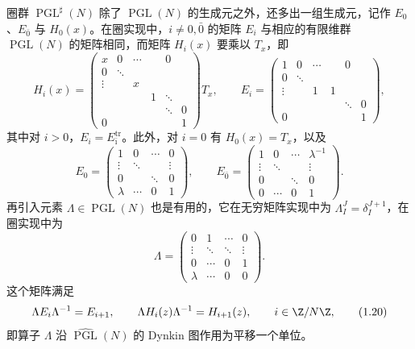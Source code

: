 圈群 $\operatorname{PGL}^{\sharp}(N)$ 除了 $\operatorname{PGL}(N)$ 的生成元之外，还多出一组生成元，记作 $E_0$、$E_{\bar0}$ 与 $H_0(x)$。在圈实现中，$i\neq0,\bar0$ 的矩阵 $E_i$ 与相应的有限维群 $\operatorname{PGL}(N)$ 的矩阵相同，而矩阵 $H_i(x)$ 要乘以 $T_x$，即
\begin{equation}\label{eq:1.17}
H_i(x)=
\begin{pmatrix}
x&0&\cdots&&0\\
0&\ddots&&&&\\
\vdots&&x&&&\\
&&&1&\ddots&\\
&&&&\ddots&0\\
0&&&&&1
\end{pmatrix}T_x,
\qquad
E_i=
\begin{pmatrix}
1&0&\cdots&&0\\
0&\ddots&&&&\\
\vdots&&1&1&&\\
&&&&\ddots&0\\
0&&&&&1
\end{pmatrix},
\tag{1.17}
\end{equation}
其中对 $i>0$，$E_i=E_{\bar\imath}^{\mathrm{tr}}$。此外，对 $i=0$ 有 $H_0(x)=T_x$，以及
\begin{equation}\label{eq:1.18}
E_0=
\begin{pmatrix}
1&0&\cdots&0\\
\vdots&\ddots&&\vdots\\
0&&\ddots&0\\
\lambda&\cdots&0&1
\end{pmatrix},
\qquad
E_{\bar0}=
\begin{pmatrix}
1&0&\cdots&\lambda^{-1}\\
\vdots&\ddots&&\vdots\\
0&&\ddots&0\\
0&\cdots&0&1
\end{pmatrix}.
\tag{1.18}
\end{equation}
再引入元素 $\Lambda\in\widehat{\operatorname{PGL}}(N)$ 也是有用的，它在无穷矩阵实现中为 $\Lambda^J_I=\delta^{J+1}_I$，在圈实现中为
\begin{equation}\label{eq:1.19}
\Lambda=
\begin{pmatrix}
0&1&\cdots&0\\
\vdots&\ddots&\ddots&\vdots\\
0&\cdots&0&1\\
\lambda&\cdots&0&0
\end{pmatrix}.
\tag{1.19}
\end{equation}
这个矩阵满足
\begin{equation}\label{eq:1.20}
\Lambda E_i\Lambda^{-1}=E_{i+1},\qquad
\Lambda H_i(z)\Lambda^{-1}=H_{i+1}(z),\qquad i\in\Z/N\Z,
\tag{1.20}
\end{equation}
即算子 $\Lambda$ 沿 $\widehat{\operatorname{PGL}}(N)$ 的 Dynkin 图作用为平移一个单位。

